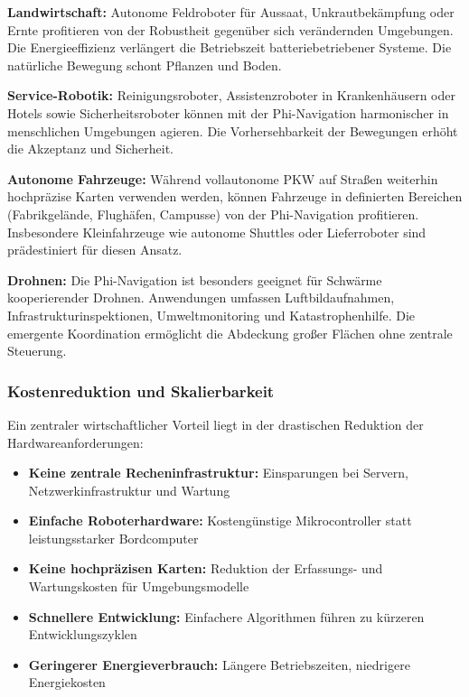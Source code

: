 ﻿\documentclass[a4paper,12pt]{article}
\theoremstyle{definition}
\begin{document}
\textbf{Landwirtschaft:} Autonome Feldroboter für Aussaat, Unkrautbekämpfung oder Ernte profitieren von der Robustheit gegenüber sich verändernden Umgebungen. Die Energieeffizienz verlängert die Betriebszeit batteriebetriebener Systeme. Die natürliche Bewegung schont Pflanzen und Boden.

\textbf{Service-Robotik:} Reinigungsroboter, Assistenzroboter in Krankenhäusern oder Hotels sowie Sicherheitsroboter können mit der Phi-Navigation harmonischer in menschlichen Umgebungen agieren. Die Vorhersehbarkeit der Bewegungen erhöht die Akzeptanz und Sicherheit.

\textbf{Autonome Fahrzeuge:} Während vollautonome PKW auf Straßen weiterhin hochpräzise Karten verwenden werden, können Fahrzeuge in definierten Bereichen (Fabrikgelände, Flughäfen, Campusse) von der Phi-Navigation profitieren. Insbesondere Kleinfahrzeuge wie autonome Shuttles oder Lieferroboter sind prädestiniert für diesen Ansatz.

\textbf{Drohnen:} Die Phi-Navigation ist besonders geeignet für Schwärme kooperierender Drohnen. Anwendungen umfassen Luftbildaufnahmen, Infrastrukturinspektionen, Umweltmonitoring und Katastrophenhilfe. Die emergente Koordination ermöglicht die Abdeckung großer Flächen ohne zentrale Steuerung.

\subsubsection{Kostenreduktion und Skalierbarkeit}

Ein zentraler wirtschaftlicher Vorteil liegt in der drastischen Reduktion der Hardwareanforderungen:

\begin{itemize}
	\item \textbf{Keine zentrale Recheninfrastruktur:} Einsparungen bei Servern, Netzwerkinfrastruktur und Wartung
	\item \textbf{Einfache Roboterhardware:} Kostengünstige Mikrocontroller statt leistungsstarker Bordcomputer
	\item \textbf{Keine hochpräzisen Karten:} Reduktion der Erfassungs- und Wartungskosten für Umgebungsmodelle
	\item \textbf{Schnellere Entwicklung:} Einfachere Algorithmen führen zu kürzeren Entwicklungszyklen
	\item \textbf{Geringerer Energieverbrauch:} Längere Betriebszeiten, niedrigere Energiekosten
\end{itemize}
\end{document}
